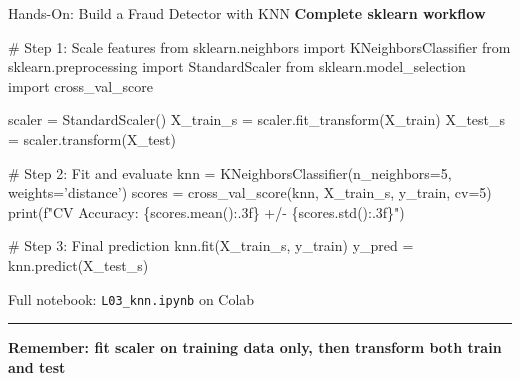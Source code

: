 \documentclass[8pt,aspectratio=169]{beamer}
\newcommand{\bottomnote}[1]{%
\vfill
\vspace{-2mm}
\textcolor{mllavender2}{\rule{\textwidth}{0.4pt}}
\vspace{1mm}
\footnotesize
\textbf{#1}
}
\begin{document}
\begin{frame}[fragile,t]{Hands-On: Build a Fraud Detector with KNN}
\small
\textbf{Complete sklearn workflow}

\vspace{2mm}
\footnotesize
\begin{semiverbatim}
\textcolor{mlgray}{# Step 1: Scale features}
\textcolor{mlblue}{from} sklearn.neighbors \textcolor{mlblue}{import} KNeighborsClassifier
\textcolor{mlblue}{from} sklearn.preprocessing \textcolor{mlblue}{import} StandardScaler
\textcolor{mlblue}{from} sklearn.model_selection \textcolor{mlblue}{import} cross_val_score

scaler = StandardScaler()
X_train_s = scaler.fit_transform(X_train)
X_test_s  = scaler.transform(X_test)

\textcolor{mlgray}{# Step 2: Fit and evaluate}
knn = KNeighborsClassifier(n_neighbors=5, weights=\textcolor{mlorange}{'distance'})
scores = cross_val_score(knn, X_train_s, y_train, cv=5)
print(f\textcolor{mlorange}{"CV Accuracy: \{scores.mean():.3f\} +/- \{scores.std():.3f\}"})

\textcolor{mlgray}{# Step 3: Final prediction}
knn.fit(X_train_s, y_train)
y_pred = knn.predict(X_test_s)
\end{semiverbatim}

\vspace{2mm}
\footnotesize
Full notebook: \texttt{L03\_knn.ipynb} on Colab
\bottomnote{Remember: fit scaler on training data only, then transform both train and test}
\end{frame}
\end{document}
